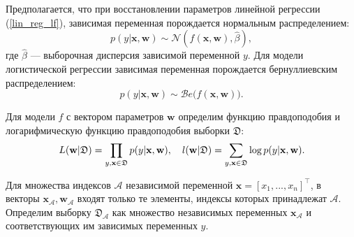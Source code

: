 \documentclass[12pt, a4paper]{scrartcl}
\theoremstyle{plain}
\theoremstyle{definition}
\begin{document}
Предполагается, что при восстановлении параметров линейной регрессии (\ref{lin_reg_lf}), зависимая переменная порождается нормальным распределением:
$$
p(y | \mathbf{x}, \mathbf{w}) \sim \mathcal{N}(f(\mathbf{x}, \mathbf{w}), \hat{\beta}),
$$
где $\hat{\beta}$ --- выборочная дисперсия зависимой переменной $y$. Для модели логистической регрессии зависимая переменная порождается бернуллиевским распределением:
$$
p(y | \mathbf{x}, \mathbf{w}) \sim \mathcal{B}e \bigl( f(\mathbf{x}, \mathbf{w})\bigr).
$$


Для модели $f$ с вектором параметров $\textbf{w}$ определим функцию правдоподобия и логарифмическую функцию правдоподобия выборки $\mathfrak D$:
\begin{equation}\label{L_l}
L(\textbf{w} | \mathfrak D) = \prod_{y, \textbf{x} \in \mathfrak D} p(y | \textbf{x}, \textbf{w}),~~~ l(\textbf w | \mathfrak D) = \sum_{y, \textbf{x} \in \mathfrak D}\log p(y | \textbf{x}, \textbf{w}).
\end{equation}







Для множества индексов $\mathcal{A}$ независимой переменной $\mathbf{x} = [x_1, ..., x_n]^{\top}$, в векторы $\mathbf{x}_{\mathcal{A}}, \mathbf{w}_{\mathcal{A}}$ входят только те элементы, индексы которых принадлежат $\mathcal{A}$. Определим выборку $\mathfrak{D}_{\mathcal{A}}$ как множество независимых переменных $\mathbf{x}_{\mathcal{A}}$ и соответствующих им зависимых переменных $y$.
\end{document}
